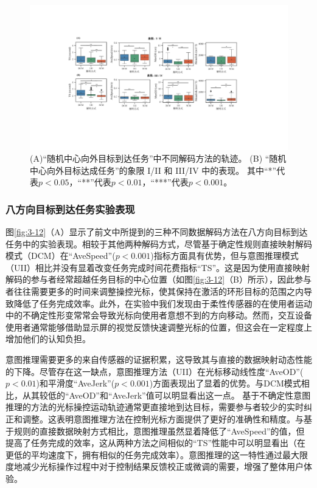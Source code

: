 \begin{figure}[!t]
    \includegraphics[width=1\textwidth]{figures/3-Fig-13.pdf}
    \caption{(A)“随机中心向外目标到达任务”中不同解码方法的轨迹。 (B) “随机中心向外目标达成任务”的象限 I/II 和 III/IV 中的表现。 其中“*”代表$p<0.05$，“**”代表$p<0.01$，“***”代表$p<0.001$。  }
    \label{fig:3-13}
\end{figure}  

\subsubsection{八方向目标到达任务实验表现}图\ref{fig:3-12}（A）显示了前文中所提到的三种不同数据解码方法在八方向目标到达任务中的实验表现。相较于其他两种解码方式，尽管基于确定性规则直接映射解码模式（DCM）在``AveSpeed''($p<0.001$)指标方面具有优势，但与意图推理模式（UII）相比并没有显着改变任务完成时间花费指标``TS''。这是因为使用直接映射解码的参与者经常超越任务目标的中心位置（如图\ref{fig:3-12}（B）所示），因此参与者往往需要更多的时间来调整操控光标，使其保持在激活的环形目标的范围之内导致降低了任务完成效率。此外，在实验中我们发现由于柔性传感器的在使用者运动中的不确定性形变常常会导致光标向使用者意想不到的方向移动。然而，交互设备使用者通常能够借助显示屏的视觉反馈快速调整光标的位置，但这会在一定程度上增加他们的认知负担。  

意图推理需要更多的来自传感器的证据积累，这导致其与直接的数据映射动态性能的下降。尽管存在这一缺点，意图推理方法（UII）在光标移动线性度``AveOD''($p<0.01$)和平滑度``AveJerk''($p<0.001$)方面表现出了显着的优势。与DCM模式相比，从其较低的``AveOD''和``AveJerk''值可以明显看出这一点。 基于不确定性意图推理的方法的光标操控运动轨迹通常更直接地到达目标，需要参与者较少的实时纠正和调整。这表明意图推理方法在控制光标方面提供了更好的准确性和精度。与基于规则的直接数据映射方式相比，意图推理虽然显着降低了``AveSpeed''的值，但提高了任务完成的效率，这从两种方法之间相似的“TS”性能中可以明显看出（在更低的平均速度下，拥有相似的任务完成效率）。意图推理的这一特性通过最大限度地减少光标操作过程中对于控制结果反馈校正或微调的需要，增强了整体用户体验。  

